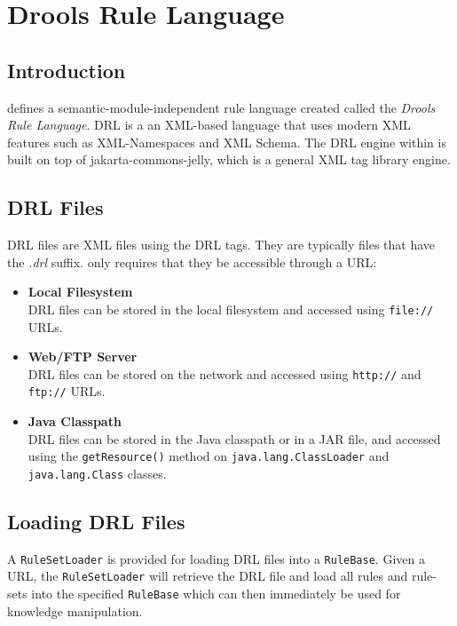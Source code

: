 \chapter{Drools Rule Language}

\section{Introduction}

\drools{} defines a semantic-module-independent rule language created 
called the \emph{Drools Rule Language}.  DRL is a an XML-based
language that uses modern XML features such as XML-Namespaces and XML
Schema. The DRL engine within \drools{} is built on top of
jakarta-commons-jelly, which is a general XML tag library
engine. 

\section{DRL Files}

DRL files are XML files using the DRL tags. They are typically files
that have the \emph{.drl} suffix.  \drools{} only requires that they
be accessible through a URL:

\begin{itemize}
	\item \textbf{\textsf{Local Filesystem}} \\
		DRL files can be stored in the local filesystem and
		accessed using \verb|file://| URLs.
	\item \textbf{\textsf{Web/FTP Server}} \\
		DRL files can be stored on the network and
		accessed using \verb|http://| and \verb|ftp://| URLs.
	\item \textbf{\textsf{Java Classpath}} \\
		DRL files can be stored in the Java classpath or in a JAR
		file, and accessed using the \verb|getResource()| method
		on \verb|java.lang.ClassLoader| and \verb|java.lang.Class|
		classes.
\end{itemize}

\section{Loading DRL Files}

A \verb|RuleSetLoader| is provided for loading DRL files into a
\verb|RuleBase|.  Given a URL, the \verb|RuleSetLoader| will retrieve
the DRL file and load all rules and rule-sets into the specified
\verb|RuleBase| which can then immediately be used for knowledge
manipulation.

